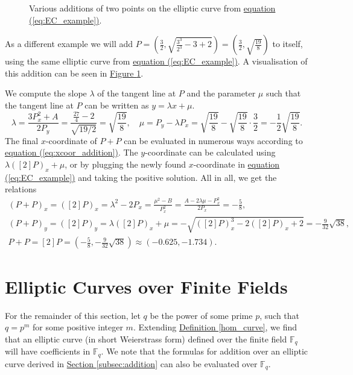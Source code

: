 \documentclass[openany, a4paper, 10pt]{book}
\theoremstyle{plain}
\theoremstyle{plain}
\theoremstyle{plain}
\theoremstyle{definition}
\theoremstyle{plain}
\theoremstyle{definition}
\theoremstyle{remark}
\renewcommand{\eqref}[1]{\hyperref[#1]{equation (\ref{#1})}}
\newcommand{\figref}[1]{\hyperref[#1]{Figure \ref{#1}}}
\newcommand{\defref}[1]{\hyperref[#1]{Definition \ref{#1}}}
\newcommand{\secref}[1]{\hyperref[#1]{Section \ref{#1}}}
\begin{document}
\begin{examplebox}
\begin{figure}[H]
\begin{minipage}{.5\textwidth}
        \end{minipage}
        \vspace{-1em}
        \caption{Various additions of two points on the elliptic curve from \eqref{eq:EC_example}.}
        \label{fig:example_addition}
    \end{figure}
    \tcbline

    As a different example we will add
    $P=\left(\frac{3}{2}, \sqrt{\frac{3^3}{2^3} - 3 + 2}\right) = \left( \frac{3}{2}, \sqrt{\frac{19}{8}} \right)$
    to itself, using the same elliptic curve from \eqref{eq:EC_example}.
    A visualisation of this addition can be seen in \figref{fig:example_addition}.

    We compute the slope $\lambda$ of the tangent line at $P$ and the parameter $\mu$ such that the tangent line at $P$ can be written as $y = \lambda x + \mu$.
    \begin{equation*}
        \lambda = \frac{3P_x^2 + A}{2P_y} = \frac{\frac{27}{4}-2}{\sqrt{19/2}} = \sqrt{\frac{19}{8}}, \quad
        \mu = P_y-\lambda P_x
          = \sqrt{\frac{19}{8}} -\sqrt{\frac{19}{8}} \cdot \frac{3}{2}
          = -\frac{1}{2} \sqrt{\frac{19}{8}}.
    \end{equation*}
    The final $x$-coordinate of $P+P$ can be evaluated in numerous ways according to \eqref{eq:xcoor_addition}.
    The $y$-coordinate can be calculated using $\lambda ([2]P)_x + \mu$,
    or by plugging the newly found $x$-coordinate in \eqref{eq:EC_example} and taking the positive solution.
    All in all, we get the relations
    \begin{gather*}
        (P+P)_x = ([2]P)_x = \lambda^2 - 2P_x = \frac{\mu^2-B}{P_x^2} = \frac{A - 2\lambda \mu - P_x^2}{2P_x} = -\frac{5}{8}, \\
        (P+P)_y = ([2]P)_y = \lambda ([2]P)_x + \mu = -\sqrt{([2]P)_x^3 - 2 ([2]P)_x + 2} = -\frac{9}{32} \sqrt{38}, \\
        P+P = [2]P = \left(-\frac{5}{8}, -\frac{9}{32}\sqrt{38}\right) \approx (-0.625, -1.734).
    \end{gather*}
\end{examplebox}


\section{Elliptic Curves over Finite Fields}\label{sec:ec_over_ff}
For the remainder of this section, let $q$ be the power of some prime $p$, such that $q=p^m$ for some positive integer $m$.
Extending \defref{hom_curve}, we find that an elliptic curve (in short Weierstrass form) defined over the finite field $\mathbb F_q$ will have coefficients in $\mathbb F_q$.
We note that the formulas for addition over an elliptic curve derived in \secref{subsec:addition} can also be evaluated over $\mathbb F_q$.
\end{document}
